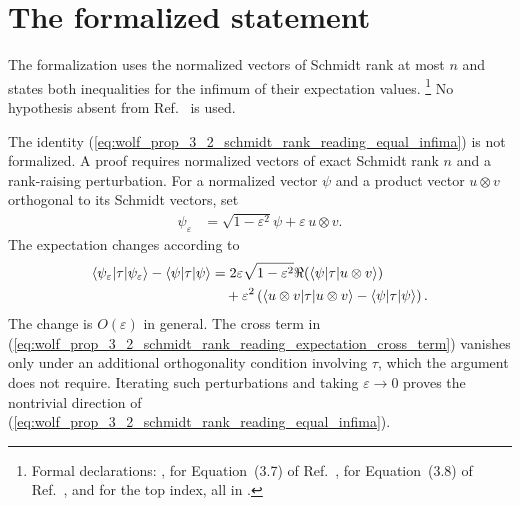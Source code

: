 \documentclass[11pt]{article}
\begin{document}
\section{The formalized statement}

The formalization uses the normalized vectors of Schmidt rank at most $n$ and
states both inequalities for the infimum of their expectation values.
\footnote{Formal declarations:
    ,
     for
    Equation~(3.7) of Ref.~\cite{Wolf2012Quantum},
     for
    Equation~(3.8) of Ref.~\cite{Wolf2012Quantum}, and
     for the top
    index, all in
    .}
No hypothesis absent from Ref.~\cite{Wolf2012Quantum} is used.

The identity
(\ref{eq:wolf_prop_3_2_schmidt_rank_reading_equal_infima}) is not formalized.
A proof requires normalized vectors of exact Schmidt rank $n$ and a
rank-raising perturbation. For a normalized vector $\psi$ and a product vector
$u\otimes v$ orthogonal to its Schmidt vectors, set
\begin{align}
    \psi_\varepsilon
        &=\sqrt{1-\varepsilon^2} \psi+\varepsilon\,u\otimes v.
    \label{eq:wolf_prop_3_2_schmidt_rank_reading_rank_raising_perturbation}
\end{align}
The expectation changes according to
\begin{align}
    \langle \psi_\varepsilon|\tau|\psi_\varepsilon\rangle
        -\langle \psi|\tau|\psi\rangle
        &=
        2\varepsilon\sqrt{1-\varepsilon^2}
        \Re\!\left(\langle \psi|\tau|u\otimes v\rangle\right)
    \label{eq:wolf_prop_3_2_schmidt_rank_reading_expectation_cross_term}\\
        &\quad+
        \varepsilon^2
        \left(\langle u\otimes v|\tau|u\otimes v\rangle
            -\langle \psi|\tau|\psi\rangle\right).
    \label{eq:wolf_prop_3_2_schmidt_rank_reading_expectation_quadratic_term}
\end{align}
The change is $O(\varepsilon)$ in general. The cross term in
(\ref{eq:wolf_prop_3_2_schmidt_rank_reading_expectation_cross_term}) vanishes
only under an additional orthogonality condition involving $\tau$, which the
argument does not require. Iterating such perturbations and taking
$\varepsilon\to0$ proves the nontrivial direction of
(\ref{eq:wolf_prop_3_2_schmidt_rank_reading_equal_infima}).
\end{document}

